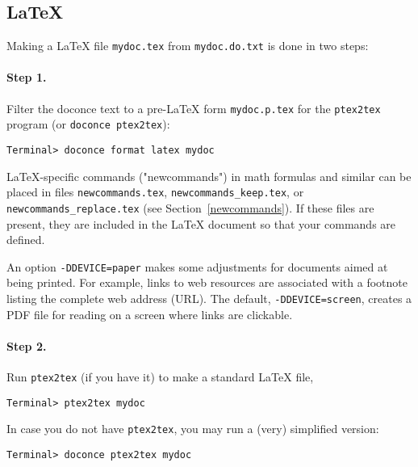 \documentclass[%
oneside,                 %
final,                   %
10pt]{article}
\begin{document}
\subsection{{\LaTeX}}

Making a {\LaTeX} file {\fontsize{10pt}{10pt}\Verb!mydoc.tex!} from {\fontsize{10pt}{10pt}\Verb!mydoc.do.txt!} is done in two steps:

\paragraph{Step 1.}
Filter the doconce text to a pre-LaTeX form {\fontsize{10pt}{10pt}\Verb!mydoc.p.tex!} for
the {\fontsize{10pt}{10pt}\Verb!ptex2tex!} program (or {\fontsize{10pt}{10pt}\Verb!doconce ptex2tex!}):
\vspace{4pt}
\begin{Verbatim}[numbers=none,frame=lines,fontsize=\fontsize{9pt}{9pt},labelposition=topline,framesep=2.5mm,framerule=0.7pt]
Terminal> doconce format latex mydoc
\end{Verbatim}
LaTeX-specific commands ("newcommands") in math formulas and similar
can be placed in files {\fontsize{10pt}{10pt}\Verb!newcommands.tex!}, {\fontsize{10pt}{10pt}\Verb!newcommands_keep.tex!}, or
{\fontsize{10pt}{10pt}\Verb!newcommands_replace.tex!} (see Section~\ref{newcommands}).
If these files are present, they are included in the {\LaTeX} document
so that your commands are defined.

An option {\fontsize{10pt}{10pt}\Verb!-DDEVICE=paper!} makes some adjustments for documents
aimed at being printed. For example, links to web resources are
associated with a footnote listing the complete web address (URL).
The default, {\fontsize{10pt}{10pt}\Verb!-DDEVICE=screen!}, creates a PDF file for reading
on a screen where links are clickable.

\paragraph{Step 2.}
Run {\fontsize{10pt}{10pt}\Verb!ptex2tex!} (if you have it) to make a standard {\LaTeX} file,
\vspace{4pt}
\begin{Verbatim}[numbers=none,frame=lines,fontsize=\fontsize{9pt}{9pt},labelposition=topline,framesep=2.5mm,framerule=0.7pt]
Terminal> ptex2tex mydoc
\end{Verbatim}
In case you do not have {\fontsize{10pt}{10pt}\Verb!ptex2tex!}, you may run a (very) simplified version:
\vspace{4pt}
\begin{Verbatim}[numbers=none,frame=lines,fontsize=\fontsize{9pt}{9pt},labelposition=topline,framesep=2.5mm,framerule=0.7pt]
Terminal> doconce ptex2tex mydoc
\end{Verbatim}
\end{document}
